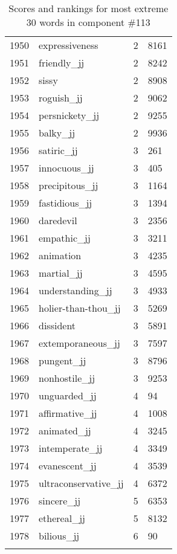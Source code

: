 \begin{longtable}[!htbp]{| rlr@{.}l |}
    1950 & expressiveness & 2 & 8161 \\
    1951 & friendly\_jj & 2 & 8242 \\
    1952 & sissy & 2 & 8908 \\
    1953 & roguish\_jj & 2 & 9062 \\
    1954 & persnickety\_jj & 2 & 9255 \\
    1955 & balky\_jj & 2 & 9936 \\
    1956 & satiric\_jj & 3 & 261 \\
    1957 & innocuous\_jj & 3 & 405 \\
    1958 & precipitous\_jj & 3 & 1164 \\
    1959 & fastidious\_jj & 3 & 1394 \\
    1960 & daredevil & 3 & 2356 \\
    1961 & empathic\_jj & 3 & 3211 \\
    1962 & animation & 3 & 4235 \\
    1963 & martial\_jj & 3 & 4595 \\
    1964 & understanding\_jj & 3 & 4933 \\
    1965 & holier-than-thou\_jj & 3 & 5269 \\
    1966 & dissident & 3 & 5891 \\
    1967 & extemporaneous\_jj & 3 & 7597 \\
    1968 & pungent\_jj & 3 & 8796 \\
    1969 & nonhostile\_jj & 3 & 9253 \\
    1970 & unguarded\_jj & 4 & 94 \\
    1971 & affirmative\_jj & 4 & 1008 \\
    1972 & animated\_jj & 4 & 3245 \\
    1973 & intemperate\_jj & 4 & 3349 \\
    1974 & evanescent\_jj & 4 & 3539 \\
    1975 & ultraconservative\_jj & 4 & 6372 \\
    1976 & sincere\_jj & 5 & 6353 \\
    1977 & ethereal\_jj & 5 & 8132 \\
    1978 & bilious\_jj & 6 & 90 \\
    \hline
    \caption{Scores and rankings for most extreme 30 words in component \#113} \\
\end{longtable}
